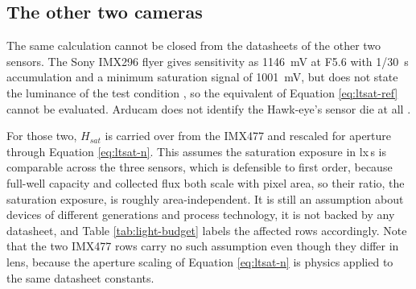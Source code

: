 \subsection{The other two cameras}

The same calculation cannot be closed from the datasheets of the other two sensors. The Sony IMX296 flyer gives sensitivity as 1146~mV at F5.6 with 1/30~s accumulation and a minimum saturation signal of 1001~mV, but does not state the luminance of the test condition \cite{sony_imx296lqr_flyer}, so the equivalent of Equation \ref{eq:ltsat-ref} cannot be evaluated. Arducam does not identify the Hawk-eye's sensor die at all \cite{arducam_hawkeye_wiki}.

For those two, $H_{sat}$ is carried over from the IMX477 and rescaled for aperture through Equation \ref{eq:ltsat-n}. This assumes the saturation exposure in lx\,s is comparable across the three sensors, which is defensible to first order, because full-well capacity and collected flux both scale with pixel area, so their ratio, the saturation exposure, is roughly area-independent. It is still an assumption about devices of different generations and process technology, it is not backed by any datasheet, and Table \ref{tab:light-budget} labels the affected rows accordingly. Note that the two IMX477 rows carry no such assumption even though they differ in lens, because the aperture scaling of Equation \ref{eq:ltsat-n} is physics applied to the same datasheet constants.

